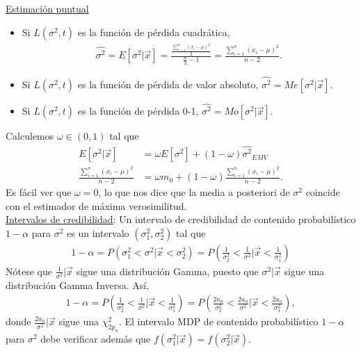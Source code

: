 \newline
\noindent \underline{Estimación puntual}
\begin{itemize}
    \item Si $L(\sigma^2,t)$ es la función de pérdida cuadrática, 
    \begin{align*}
        \widehat{\sigma^2} = E[\sigma^2 |  \vec{x}] = \frac{\frac{ \sum_{i=1}^{n} (x_i- \mu)^2}{2}}{\frac{n}{2}-1} = \frac{\sum_{i=1}^{n} (x_i- \mu)^2}{n-2}.
    \end{align*}
    \item Si $L(\sigma^2,t)$ es la función de pérdida de valor absoluto, $\widehat{\sigma^2} = Me[\sigma^2 |  \vec{x}]$.
    \item Si $L(\sigma^2,t)$ es la función de pérdida 0-1, $ \widehat{\sigma^2} = Mo[\sigma^2 |  \vec{x}]$.
\end{itemize}
Calculemos $\omega \in (0,1)$ tal que 
\begin{align*}
    E[\sigma^2  | \vec{x}] &= \omega E[\sigma^2]  + (1 - \omega) \widehat{\sigma^2 }_{EMV}  \\
    \frac{\sum_{i=1}^{n} (x_i- \mu)^2}{n-2}         &= \omega m_0 + (1-\omega) \frac{\sum_{i=1}^{n}{(x_i -\mu)^2}}{n-2}.
\end{align*}
Es fácil ver que $\omega = 0$, lo que nos dice que la media a posteriori de $\sigma^2$ coincide con el estimador de máxima verosimilitud.
\\
\newline
\noindent \underline{Intervalos de credibilidad}: Un intervalo de credibilidad de contenido probabilístico $1-\alpha$ para $\sigma^2$ es un intervalo $(\sigma_1^2, \sigma_2^2)$ tal que
\begin{align*}
    1 - \alpha = P(\sigma_1^2 < \sigma^2 | \vec{x} < \sigma_2^2) = P\left( \frac{1}{\sigma_2^2} < \frac{1}{\sigma^2} |  \vec{x} < \frac{1}{\sigma_1^2} \right)
\end{align*}
Nótese que $\frac{1}{\sigma^2} | \vec{x}$ sigue una distribución Gamma, puesto que $\sigma^2 | \vec{x}$ sigue una distribución Gamma Inversa. Así, 
\begin{align*}
    1 - \alpha = P\left( \frac{1}{\sigma_2^2} < \frac{1}{\sigma^2} |  \vec{x} < \frac{1}{\sigma_1^2} \right) = P\left( \frac{2a_n}{\sigma_2^2} < \frac{2a_n}{\sigma^2} |  \vec{x} < \frac{2a_n}{\sigma_1^2} \right),
\end{align*}
donde $\frac{2a_n}{\sigma^2} | \vec{x}$ sigue una $\chi^2_{2p_n}$. El intervalo MDP de contenido probabilístico $1-\alpha$ para $\sigma^2$ debe verificar además que $f(\sigma_1^2 | \vec{x}) = f(\sigma_2^2 | \vec{x})$.
